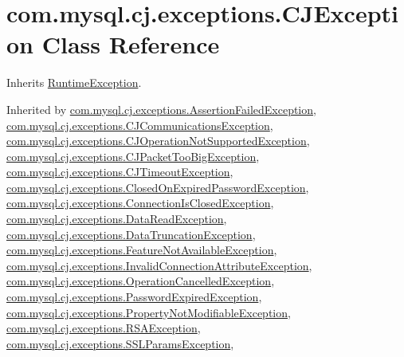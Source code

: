 \hypertarget{classcom_1_1mysql_1_1cj_1_1exceptions_1_1_c_j_exception}{}\section{com.\+mysql.\+cj.\+exceptions.\+C\+J\+Exception Class Reference}
\label{classcom_1_1mysql_1_1cj_1_1exceptions_1_1_c_j_exception}


Inherits \mbox{\hyperlink{class_runtime_exception}{Runtime\+Exception}}.



Inherited by \mbox{\hyperlink{classcom_1_1mysql_1_1cj_1_1exceptions_1_1_assertion_failed_exception}{com.\+mysql.\+cj.\+exceptions.\+Assertion\+Failed\+Exception}}, \mbox{\hyperlink{classcom_1_1mysql_1_1cj_1_1exceptions_1_1_c_j_communications_exception}{com.\+mysql.\+cj.\+exceptions.\+C\+J\+Communications\+Exception}}, \mbox{\hyperlink{classcom_1_1mysql_1_1cj_1_1exceptions_1_1_c_j_operation_not_supported_exception}{com.\+mysql.\+cj.\+exceptions.\+C\+J\+Operation\+Not\+Supported\+Exception}}, \mbox{\hyperlink{classcom_1_1mysql_1_1cj_1_1exceptions_1_1_c_j_packet_too_big_exception}{com.\+mysql.\+cj.\+exceptions.\+C\+J\+Packet\+Too\+Big\+Exception}}, \mbox{\hyperlink{classcom_1_1mysql_1_1cj_1_1exceptions_1_1_c_j_timeout_exception}{com.\+mysql.\+cj.\+exceptions.\+C\+J\+Timeout\+Exception}}, \mbox{\hyperlink{classcom_1_1mysql_1_1cj_1_1exceptions_1_1_closed_on_expired_password_exception}{com.\+mysql.\+cj.\+exceptions.\+Closed\+On\+Expired\+Password\+Exception}}, \mbox{\hyperlink{classcom_1_1mysql_1_1cj_1_1exceptions_1_1_connection_is_closed_exception}{com.\+mysql.\+cj.\+exceptions.\+Connection\+Is\+Closed\+Exception}}, \mbox{\hyperlink{classcom_1_1mysql_1_1cj_1_1exceptions_1_1_data_read_exception}{com.\+mysql.\+cj.\+exceptions.\+Data\+Read\+Exception}}, \mbox{\hyperlink{classcom_1_1mysql_1_1cj_1_1exceptions_1_1_data_truncation_exception}{com.\+mysql.\+cj.\+exceptions.\+Data\+Truncation\+Exception}}, \mbox{\hyperlink{classcom_1_1mysql_1_1cj_1_1exceptions_1_1_feature_not_available_exception}{com.\+mysql.\+cj.\+exceptions.\+Feature\+Not\+Available\+Exception}}, \mbox{\hyperlink{classcom_1_1mysql_1_1cj_1_1exceptions_1_1_invalid_connection_attribute_exception}{com.\+mysql.\+cj.\+exceptions.\+Invalid\+Connection\+Attribute\+Exception}}, \mbox{\hyperlink{classcom_1_1mysql_1_1cj_1_1exceptions_1_1_operation_cancelled_exception}{com.\+mysql.\+cj.\+exceptions.\+Operation\+Cancelled\+Exception}}, \mbox{\hyperlink{classcom_1_1mysql_1_1cj_1_1exceptions_1_1_password_expired_exception}{com.\+mysql.\+cj.\+exceptions.\+Password\+Expired\+Exception}}, \mbox{\hyperlink{classcom_1_1mysql_1_1cj_1_1exceptions_1_1_property_not_modifiable_exception}{com.\+mysql.\+cj.\+exceptions.\+Property\+Not\+Modifiable\+Exception}}, \mbox{\hyperlink{classcom_1_1mysql_1_1cj_1_1exceptions_1_1_r_s_a_exception}{com.\+mysql.\+cj.\+exceptions.\+R\+S\+A\+Exception}}, \mbox{\hyperlink{classcom_1_1mysql_1_1cj_1_1exceptions_1_1_s_s_l_params_exception}{com.\+mysql.\+cj.\+exceptions.\+S\+S\+L\+Params\+Exception}}, 